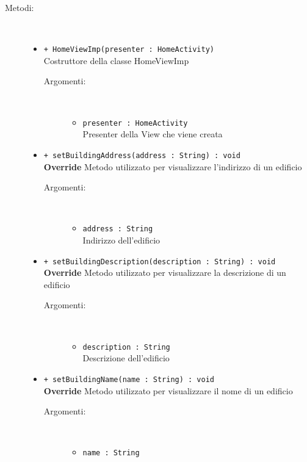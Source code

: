 \documentclass[../DefinizioneDiProdotto.tex]{subfiles}
\begin{document}
\begin{description}
\begin{itemize}
\end{itemize}
\item[Metodi:] \
\begin{itemize}
\item \texttt{+ HomeViewImp(presenter : HomeActivity)}\\
Costruttore della classe HomeViewImp
 \begin{description}
\item[Argomenti:] \
\begin{itemize}
\item \texttt{presenter : HomeActivity}\\
Presenter della View che viene creata\end{itemize}
\end{description}
\item \texttt{+ setBuildingAddress(address : String) : void}\\
\textbf{Override} Metodo utilizzato per visualizzare l'indirizzo di un edificio
 \begin{description}
\item[Argomenti:] \
\begin{itemize}
\item \texttt{address : String}\\
Indirizzo dell'edificio\end{itemize}
\end{description}
\item \texttt{+ setBuildingDescription(description : String) : void}\\
\textbf{Override} Metodo utilizzato per visualizzare la descrizione di un edificio
 \begin{description}
\item[Argomenti:] \
\begin{itemize}
\item \texttt{description : String}\\
Descrizione dell'edificio\end{itemize}
\end{description}
\item \texttt{+ setBuildingName(name : String) : void}\\
\textbf{Override} Metodo utilizzato per visualizzare il nome di un edificio
 \begin{description}
\item[Argomenti:] \
\begin{itemize}
\item \texttt{name : String}\\

\end{itemize}
\end{description}
\end{itemize}
\end{description}
\end{document}
